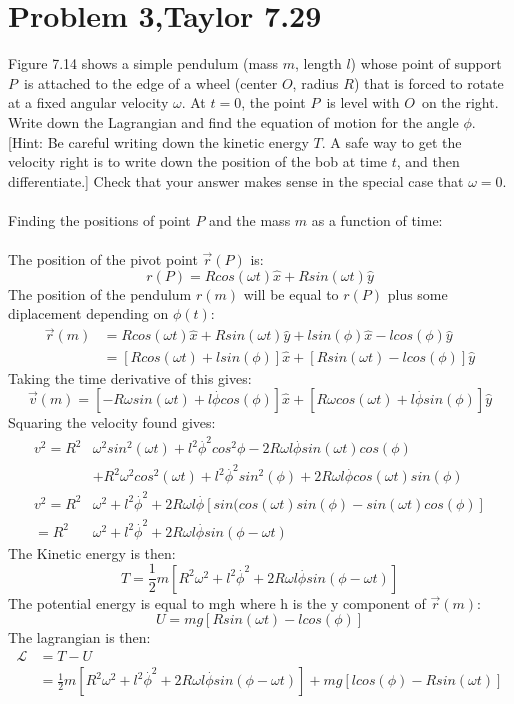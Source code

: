 \documentclass[a4paper,12pt]{article}
\newcommand{\F}[2]{\ensuremath{\frac{#1}{#2}}}
\newcommand{\Q}[1]{\newpage \section*{#1}}
\newcommand{\vel}[1]{\overset{.}{#1}}
\begin{document}
\Q{Problem 3,Taylor 7.29}
Figure 7.14 shows a simple pendulum (mass $m$, length $l$) whose point of support $P$~is attached to the edge of a wheel (center $O$, radius $R$) that is forced to rotate at a fixed angular velocity $\omega$.  At $t=0$, the point $P$~is level with $O$~on the right.  Write down the Lagrangian and find the equation of motion for the angle $\phi$.  [Hint: Be careful writing down the kinetic energy $T$. A safe way to get the velocity right is to write down the position of the bob at time $t$, and then differentiate.] Check that your answer makes sense in the special case that $\omega=0$.\\ \\
 Finding the positions of point $P$ and the mass $m$ as a function of time:\\ \\
The position of the pivot point $\vec{r}(P)$ is:
\[r(P)=Rcos(\omega t)\hat{x}+Rsin(\omega t)\hat{y}\]
The position of the pendulum $r(m)$ will be equal to $r(P)$ plus some diplacement depending on $\phi(t)$:
\begin{align*}
\vec{r}(m)&=Rcos(\omega t)\hat{x}+Rsin(\omega t)\hat{y}+lsin(\phi)\hat{x}-lcos(\phi)\hat{y}\\
&=[Rcos(\omega t)+lsin(\phi)]\hat{x}+[Rsin(\omega t)-lcos(\phi)]\hat{y}
\end{align*}
Taking the time derivative of this gives:
\[\vec{v}(m)=[-R\omega sin(\omega t)+l\vel{\phi}cos(\phi)]\hat{x}+[R\omega cos(\omega t)+l\vel{\phi}sin(\phi)]\hat{y}\]
Squaring the velocity found gives:
\begin{align*}
v^2=R^2&\omega^2sin^2(\omega t)+l^2\vel{\phi}^2cos^2{\phi}-2R\omega l\vel{\phi}sin(\omega t)cos(\phi)\\
&+R^2\omega^2cos^2(\omega t)+l^2\vel{\phi}^2sin^2(\phi)+2R\omega l\vel{\phi}cos(\omega t)sin(\phi)\\
v^2=R^2&\omega^2+l^2\vel{\phi}^2+2R\omega l\vel{\phi}[sin(cos(\omega t)sin(\phi)-sin(\omega t)cos(\phi)]\\
=R^2&\omega^2+l^2\vel{\phi}^2+2R\omega l\vel{\phi}sin(\phi-\omega t)
\end{align*}
The Kinetic energy is then:
\[T=\F{1}{2}m[R^2\omega^2+l^2\vel{\phi}^2+2R\omega l\vel{\phi}sin(\phi-\omega t)]\]
The potential energy is equal to mgh where h is the y component of $\vec{r}(m)$:
\[U=mg[Rsin(\omega t)-lcos(\phi)]\]
The lagrangian is then:
\begin{align*}
\mathcal{L}&=T-U\\
&=\F{1}{2}m[R^2\omega^2+l^2\vel{\phi}^2+2R\omega l\vel{\phi}sin(\phi-\omega t)]+mg[lcos(\phi)-Rsin(\omega t)]
\end{align*}
\end{document}
